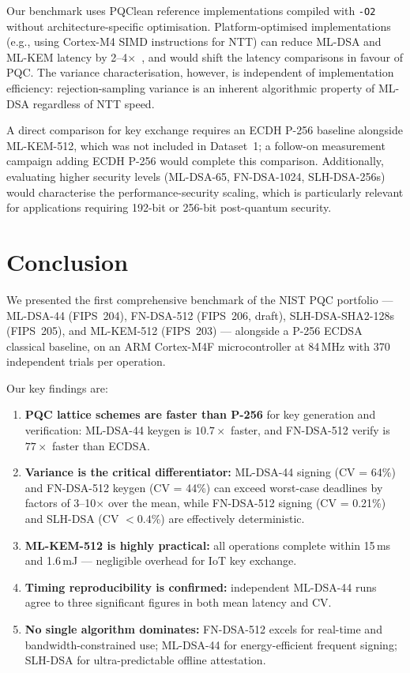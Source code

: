 \documentclass[iicol]{sn-jnl}
\begin{document}
Our benchmark uses PQClean reference implementations compiled with
\texttt{-O2} without architecture-specific optimisation.
Platform-optimised implementations (e.g., using Cortex-M4 SIMD instructions
for NTT) can reduce ML-DSA and ML-KEM latency by 2--4$\times$~\cite{pqm4},
and would shift the latency comparisons in favour of PQC.
The variance characterisation, however, is independent of implementation
efficiency: rejection-sampling variance is an inherent algorithmic property
of ML-DSA regardless of NTT speed.

A direct comparison for key exchange requires an ECDH P-256 baseline
alongside ML-KEM-512, which was not included in Dataset~1; a follow-on
measurement campaign adding ECDH P-256 would complete this comparison.
Additionally, evaluating higher security levels (ML-DSA-65, FN-DSA-1024,
SLH-DSA-256s) would characterise the performance-security scaling, which
is particularly relevant for applications requiring 192-bit or 256-bit
post-quantum security.

\section{Conclusion}
\label{sec:conclusion}

We presented the first comprehensive benchmark of the NIST PQC portfolio
--- ML-DSA-44 (FIPS~204), FN-DSA-512 (FIPS~206, draft),
SLH-DSA-SHA2-128s (FIPS~205), and ML-KEM-512 (FIPS~203) ---
alongside a P-256 ECDSA classical baseline, on an ARM Cortex-M4F
microcontroller at 84\,MHz with 370 independent trials per operation.

Our key findings are:
\begin{enumerate}
  \item \textbf{PQC lattice schemes are faster than P-256} for key generation
        and verification: ML-DSA-44 keygen is $10.7\times$ faster, and
        FN-DSA-512 verify is $77\times$ faster than ECDSA.
  \item \textbf{Variance is the critical differentiator:} ML-DSA-44 signing
        (CV = 64\%) and FN-DSA-512 keygen (CV = 44\%) can exceed
        worst-case deadlines by factors of 3--10$\times$ over the mean,
        while FN-DSA-512 signing (CV = 0.21\%) and SLH-DSA (CV $< 0.4$\%)
        are effectively deterministic.
  \item \textbf{ML-KEM-512 is highly practical:} all operations complete
        within 15\,ms and 1.6\,mJ --- negligible overhead for IoT key exchange.
  \item \textbf{Timing reproducibility is confirmed:} independent ML-DSA-44
        runs agree to three significant figures in both mean latency and CV\@.
  \item \textbf{No single algorithm dominates:} FN-DSA-512 excels for
        real-time and bandwidth-constrained use; ML-DSA-44 for energy-efficient
        frequent signing; SLH-DSA for ultra-predictable offline attestation.
\end{enumerate}
\end{document}
